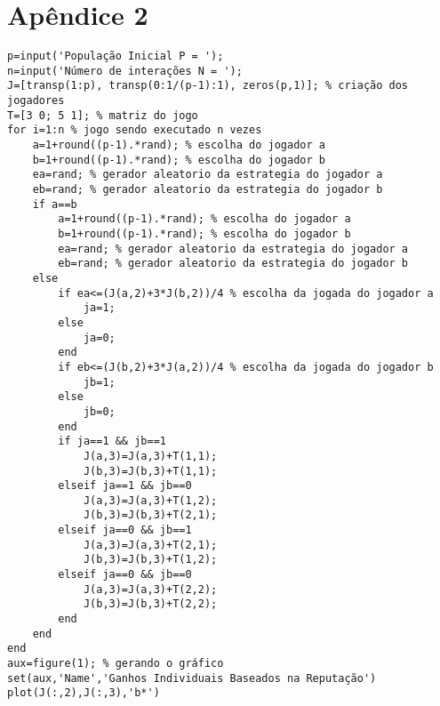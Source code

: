 %

\section*{Apêndice 2}

{\scriptsize
\begin{verbatim}
p=input('População Inicial P = ');
n=input('Número de interações N = ');
J=[transp(1:p), transp(0:1/(p-1):1), zeros(p,1)]; % criação dos jogadores
T=[3 0; 5 1]; % matriz do jogo
for i=1:n % jogo sendo executado n vezes
    a=1+round((p-1).*rand); % escolha do jogador a
    b=1+round((p-1).*rand); % escolha do jogador b
    ea=rand; % gerador aleatorio da estrategia do jogador a
    eb=rand; % gerador aleatorio da estrategia do jogador b
    if a==b
        a=1+round((p-1).*rand); % escolha do jogador a
        b=1+round((p-1).*rand); % escolha do jogador b
        ea=rand; % gerador aleatorio da estrategia do jogador a
        eb=rand; % gerador aleatorio da estrategia do jogador b
    else
        if ea<=(J(a,2)+3*J(b,2))/4 % escolha da jogada do jogador a
            ja=1;
        else
            ja=0;
        end
        if eb<=(J(b,2)+3*J(a,2))/4 % escolha da jogada do jogador b
            jb=1;
        else
            jb=0;
        end
        if ja==1 && jb==1
            J(a,3)=J(a,3)+T(1,1);
            J(b,3)=J(b,3)+T(1,1);
        elseif ja==1 && jb==0
            J(a,3)=J(a,3)+T(1,2);
            J(b,3)=J(b,3)+T(2,1);
        elseif ja==0 && jb==1
            J(a,3)=J(a,3)+T(2,1);
            J(b,3)=J(b,3)+T(1,2);
        elseif ja==0 && jb==0
            J(a,3)=J(a,3)+T(2,2);
            J(b,3)=J(b,3)+T(2,2);
        end
    end
end
aux=figure(1); % gerando o gráfico
set(aux,'Name','Ganhos Individuais Baseados na Reputação')
plot(J(:,2),J(:,3),'b*')
\end{verbatim}}



%
